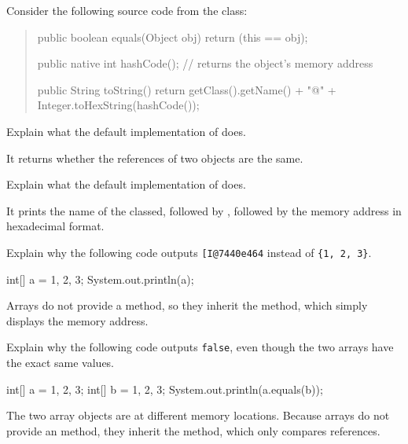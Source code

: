 
Consider the following source code from the  class:

\begin{quote}
\begin{javalst}
public boolean equals(Object obj) {
    return (this == obj);
}

public native int hashCode();  // returns the object's memory address

public String toString() {
    return getClass().getName() + "@" + Integer.toHexString(hashCode());
}
\end{javalst}
\end{quote}




\Q Explain what the default implementation of  does.

\begin{answer}[3em]
It returns whether the references of two objects are the same.
\end{answer}


\Q Explain what the default implementation of  does.

\begin{answer}[3em]
It prints the name of the classed, followed by , followed by the memory address in hexadecimal format.
\end{answer}


\Q Explain why the following code outputs \texttt{[I@7440e464} instead of \texttt{\{1, 2, 3\}}.

\begin{javalst}
int[] a = {1, 2, 3};
System.out.println(a);
\end{javalst}

\begin{answer}[3em]
Arrays do not provide a  method, so they inherit the  method, which simply displays the memory address.
\end{answer}


\Q Explain why the following code outputs \texttt{false}, even though the two arrays have the exact same values.

\begin{javalst}
int[] a = {1, 2, 3};
int[] b = {1, 2, 3};
System.out.println(a.equals(b));
\end{javalst}

\begin{answer}[3em]
The two array objects are at different memory locations.
Because arrays do not provide an  method, they inherit the  method, which only compares references.
\end{answer}
